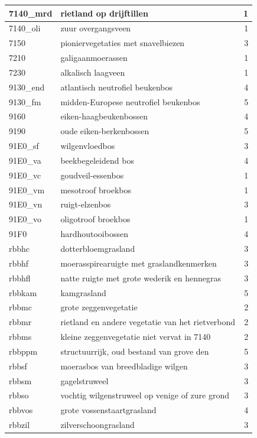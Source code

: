 \documentclass[11pt,]{book}
\begin{document}
\begin{table}
\begin{tabular}[t]{l|l|r}
\hline
7140\_mrd & rietland op drijftillen & 1\\
\hline
7140\_oli & zuur overgangsveen & 1\\
\hline
7150 & pioniervegetaties met snavelbiezen & 3\\
\hline
7210 & galigaanmoerassen & 1\\
\hline
7230 & alkalisch laagveen & 1\\
\hline
9130\_end & atlantisch neutrofiel beukenbos & 4\\
\hline
9130\_fm & midden-Europese neutrofiel beukenbos & 5\\
\hline
9160 & eiken-haagbeukenbossen & 4\\
\hline
9190 & oude eiken-berkenbossen & 5\\
\hline
91E0\_sf & wilgenvloedbos & 3\\
\hline
91E0\_va & beekbegeleidend bos & 4\\
\hline
91E0\_vc & goudveil-essenbos & 1\\
\hline
91E0\_vm & mesotroof broekbos & 1\\
\hline
91E0\_vn & ruigt-elzenbos & 3\\
\hline
91E0\_vo & oligotroof broekbos & 1\\
\hline
91F0 & hardhoutooibossen & 4\\
\hline
rbbhc & dotterbloemgrasland & 3\\
\hline
rbbhf & moerasspirearuigte met graslandkenmerken & 3\\
\hline
rbbhfl & natte ruigte met grote wederik en hennegras & 3\\
\hline
rbbkam & kamgrasland & 5\\
\hline
rbbmc & grote zeggenvegetatie & 2\\
\hline
rbbmr & rietland en andere vegetatie van het rietverbond & 2\\
\hline
rbbms & kleine zeggenvegetatie niet vervat in 7140 & 2\\
\hline
rbbppm & structuurrijk, oud bestand van grove den & 5\\
\hline
rbbsf & moerasbos van breedbladige wilgen & 3\\
\hline
rbbsm & gagelstruweel & 3\\
\hline
rbbso & vochtig wilgenstruweel op venige of zure grond & 3\\
\hline
rbbvos & grote vossenstaartgrasland & 4\\
\hline
rbbzil & zilverschoongrasland & 3\\
\hline
\end{tabular}
\end{table}
\end{document}
